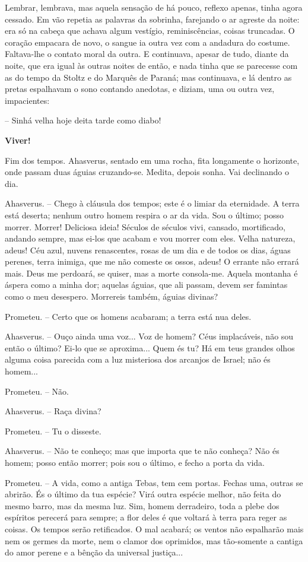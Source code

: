Lembrar, lembrava, mas aquela sensação de há pouco, reflexo apenas,
tinha agora cessado. Em vão repetia as palavras da sobrinha, farejando o
ar agreste da noite: era só na cabeça que achava algum vestígio,
reminiscências, coisas truncadas. O coração empacara de novo, o sangue
ia outra vez com a andadura do costume. Faltava-lhe o contato moral da
outra. E continuava, apesar de tudo, diante da noite, que era igual às
outras noites de então, e nada tinha que se parecesse com as do tempo da
Stoltz e do Marquês de Paraná; mas continuava, e lá dentro as pretas
espalhavam o sono contando anedotas, e diziam, uma ou outra vez,
impacientes:

-- Sinhá velha hoje deita tarde como diabo!

\textbf{Viver!}

Fim dos tempos. Ahasverus, sentado em uma rocha, fita longamente o
horizonte, onde passam duas águias cruzando-se. Medita, depois sonha.
Vai declinando o dia.

Ahasverus. -- Chego à cláusula dos tempos; este é o limiar da
eternidade. A terra está deserta; nenhum outro homem respira o ar da
vida. Sou o último; posso morrer. Morrer! Deliciosa ideia! Séculos de
séculos vivi, cansado, mortificado, andando sempre, mas ei-los que
acabam e vou morrer com eles. Velha natureza, adeus! Céu azul, nuvens
renascentes, rosas de um dia e de todos os dias, águas perenes, terra
inimiga, que me não comeste os ossos, adeus! O errante não errará mais.
Deus me perdoará, se quiser, mas a morte consola-me. Aquela montanha é
áspera como a minha dor; aquelas águias, que ali passam, devem ser
famintas como o meu desespero. Morrereis também, águias divinas?

Prometeu. -- Certo que os homens acabaram; a terra está nua deles.

Ahasverus. -- Ouço ainda uma voz... Voz de homem? Céus implacáveis, não
sou então o último? Ei-lo que se aproxima... Quem és tu? Há em teus
grandes olhos alguma coisa parecida com a luz misteriosa dos arcanjos de
Israel; não és homem...

Prometeu. -- Não.

Ahasverus. -- Raça divina?

Prometeu. -- Tu o disseste.

Ahasverus. -- Não te conheço; mas que importa que te não conheça? Não és
homem; posso então morrer; pois sou o último, e fecho a porta da vida.

Prometeu. -- A vida, como a antiga Tebas, tem cem portas. Fechas uma,
outras se abrirão. És o último da tua espécie? Virá outra espécie
melhor, não feita do mesmo barro, mas da mesma luz. Sim, homem
derradeiro, toda a plebe dos espíritos perecerá para sempre; a flor
deles é que voltará à terra para reger as coisas. Os tempos serão
retificados. O mal acabará; os ventos não espalharão mais nem os germes
da morte, nem o clamor dos oprimidos, mas tão-somente a cantiga do amor
perene e a bênção da universal justiça...

